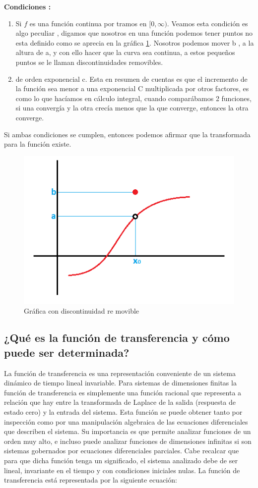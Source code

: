 \textbf{Condiciones :}
\begin{enumerate}
	\item Si $ f  $ es una función continua por tramos en $ [0, \infty) $.
	\subitem Veamos esta condición es algo peculiar , digamos  que nosotros en una función podemos tener puntos no esta definido como se aprecia en la gráfica \ref{fig:ilustracion1}. Nosotros podemos mover b , a la altura de a, y con ello hacer que la curva sea continua, a estos pequeños puntos se le llaman discontinuidades removibles.
	\item  de orden exponencial c.
	\subitem Esta en resumen de cuentas es que el incremento de la función sea menor a una exponencial C multiplicada por otros factores, es como lo que hacíamos en cálculo integral, cuando comparábamos 2 funciones, si una convergía y la otra crecía menos que la que converge, entonces la otra converge.
\end{enumerate}

Si ambas condiciones se cumplen, entonces podemos afirmar que la transformada para la función existe.

\begin{figure}[h]
	\centering
	\includegraphics[width=0.7\linewidth]{img/ilustracion_1}
	\caption{Gráfica con discontinuidad re movible}
	\label{fig:ilustracion1}
\end{figure}


\subsection{¿Qué es la función de transferencia y cómo puede ser determinada?}	
La función de transferencia es una representación conveniente de un sistema dinámico de tiempo lineal invariable. Para sistemas de dimensiones finitas la función de transferencia es simplemente una función racional que representa a relación que hay entre la transformada de Laplace de la salida (respuesta de estado cero) y la entrada del sistema. Esta función se puede obtener tanto por inspección como por una manipulación algebraica de las ecuaciones diferenciales que describen el sistema. Su importancia es que permite analizar funciones de un orden muy alto, e incluso puede analizar funciones de dimensiones infinitas si son sistemas gobernados por ecuaciones diferenciales parciales. Cabe recalcar que para que dicha función tenga un significado, el sistema analizado debe de ser lineal, invariante en el tiempo y con condiciones iniciales nulas. La función de transferencia está representada por la siguiente ecuación:

